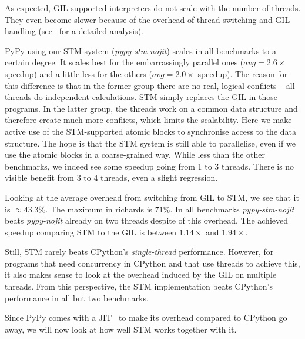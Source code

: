 \documentclass{sigplanconf}
\begin{document}
As expected, GIL-supported interpreters do not scale with the number
of threads. They even become slower because of the overhead of
thread-switching and GIL handling (see~\cite{beazley10} for a detailed
analysis).

PyPy using our STM system (\emph{pypy-stm-nojit}) scales in all
benchmarks to a certain degree. It scales best for the embarrassingly
parallel ones ($avg=2.6\times$ speedup) and a little less for
the others ($avg=2.0\times$ speedup). The reason for this difference is
that in the former group there are no real, logical conflicts -- all
threads do independent calculations. STM simply replaces the GIL in
those programs. In the latter group, the threads work on a common data
structure and therefore create much more conflicts, which limits the
scalability. Here we make active use of the STM-supported atomic
blocks to synchronise access to the data structure. The hope
is that the STM system is still able to parallelise, even if we use
the atomic blocks in a coarse-grained way. While less than the other
benchmarks, we indeed see some speedup going from 1 to 3 threads.
There is no visible benefit from 3 to 4 threads, even a slight
regression.

Looking at the average overhead from switching from GIL to STM, we see
that it is $\approx 43.3\%$. The maximum in richards is $71\%$. In all
benchmarks \emph{pypy-stm-nojit} beats \emph{pypy-nojit} already on
two threads despite of this overhead.  The achieved speedup comparing
STM to the GIL is between $1.14\times$ and $1.94\times$.

Still, STM rarely beats CPython's \emph{single-thread} performance. However, for
programs that need concurrency in CPython and that use threads to
achieve this, it also makes sense to look at the overhead induced by
the GIL on multiple threads. From this perspective, the STM
implementation beats CPython's performance in all but two benchmarks.

Since PyPy comes with a JIT~\cite{cfbolz09} to make its overhead
compared to CPython go away, we will now look at how well STM works
together with it.
\end{document}
